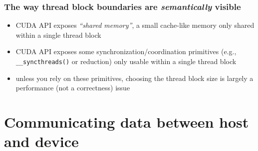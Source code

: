 \documentclass[12pt,dvipdfmx]{beamer}
\newcommand{\ao}[1]{{\color{blue}#1}}
\begin{document}
\begin{frame}
  \frametitle{The way thread block boundaries are {\it semantically} visible}
  \begin{itemize}
  \item<2-> CUDA API exposes \ao{\it ``shared memory''}, a small cache-like
    memory only shared within a single thread block
  \item<3-> CUDA API exposes some synchronization/coordination primitives
    (e.g., {\tt \_\_syncthreads()} or reduction) only usable within
    a single thread block
  \item<4-> unless you rely on these primitives,
    choosing the thread block size is largely a performance
    (not a correctness) issue
  \end{itemize}
  \begin{center}
  \end{center}
\end{frame}

\section{Communicating data between host and device}
\end{document}
